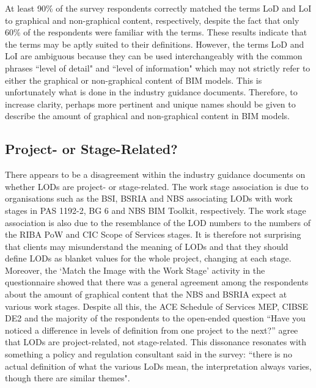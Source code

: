 At least 90\% of the survey respondents correctly matched the terms LoD and LoI to graphical and non-graphical content, respectively, despite the fact that only 60\% of the respondents were familiar with the terms.
These results indicate that the terms may be aptly suited to their definitions.
However, the terms LoD and LoI are ambiguous because they can be used interchangeably with the common phrases ``level of detail" and ``level of information" which may not strictly refer to either the graphical or non-graphical content of BIM models.
This is unfortunately what is done in the industry guidance documents.
Therefore, to increase clarity, perhaps more pertinent and unique names should be given to describe the amount of graphical and non-graphical content in BIM models.




\subsection{Project- or Stage-Related?}


There appears to be a disagreement within the industry guidance documents on whether LODs are project- or stage-related.
The work stage association is due to organisations such as the BSI, BSRIA and NBS associating LODs with work stages in PAS 1192-2, BG 6 and NBS BIM Toolkit, respectively.
The work stage association is also due to the resemblance of the LOD numbers to the numbers of the RIBA PoW and CIC Scope of Services stages.
It is therefore not surprising that clients may misunderstand the meaning of LODs and that they should define LODs as blanket values for the whole project, changing at each stage.
Moreover, the `Match the Image with the Work Stage' activity in the questionnaire showed that there was a general agreement among the respondents about the amount of graphical content that the NBS and BSRIA expect at various work stages.
Despite all this, the ACE Schedule of Services MEP, CIBSE DE2 and the majority of the respondents to the open-ended question “Have you noticed a difference in levels of definition from one project to the next?” agree that LODs are project-related, not stage-related.
This dissonance resonates with something a policy and regulation consultant said in the survey: ``there is no actual definition of what the various LoDs mean, the interpretation always varies, though there are similar themes".

